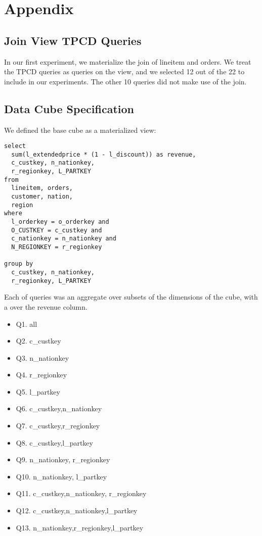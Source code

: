 \section{Appendix}

\subsection{Join View TPCD Queries}
In our first experiment, we materialize the join of lineitem and orders.
We treat the TPCD queries as queries on the view, and we selected 12 out of the 22 to include in our experiments.
The other 10 queries did not make use of the join.

\subsection{Data Cube Specification}
We defined the base cube as a materialized view:
\begin{lstlisting}
select
  sum(l_extendedprice * (1 - l_discount)) as revenue,
  c_custkey, n_nationkey,
  r_regionkey, L_PARTKEY
from
  lineitem, orders,
  customer, nation,
  region
where
  l_orderkey = o_orderkey and
  O_CUSTKEY = c_custkey and
  c_nationkey = n_nationkey and
  N_REGIONKEY = r_regionkey

group by
  c_custkey, n_nationkey, 
  r_regionkey, L_PARTKEY
\end{lstlisting}

Each of queries was an aggregate over subsets of the dimensions of the cube, 
with a \sumfunc over the revenue column.
\begin{itemize}
\item Q1. all
\item Q2. c\_custkey
\item Q3. n\_nationkey
\item Q4. r\_regionkey
\item Q5. l\_partkey
\item Q6. c\_custkey,n\_nationkey
\item Q7. c\_custkey,r\_regionkey
\item Q8. c\_custkey,l\_partkey
\item Q9. n\_nationkey, r\_regionkey
\item Q10. n\_nationkey, l\_partkey
\item Q11. c\_custkey,n\_nationkey, r\_regionkey
\item Q12. c\_custkey,n\_nationkey,l\_partkey
\item Q13. n\_nationkey,r\_regionkey,l\_partkey
\end{itemize}

